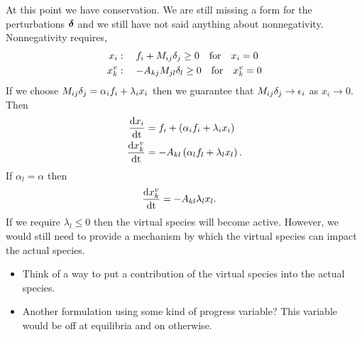 At this point we have conservation.  We are still missing a form 
for the perturbations $\boldsymbol{\delta}$ and we still have not said anything 
about nonnegativity.  Nonnegativity requires,
\begin{align}
  x_{i}    &: \quad f_{i} + M_{ij}\delta_{j} \geq 0 
       \quad \textrm{for} \quad x_{i} = 0 \\
  x_{k}^{v}&: \quad -A_{kj}M_{jl}\delta_{l} \geq 0 
       \quad \textrm{for} \quad x_{k}^{v} = 0
\end{align}
If we choose $M_{ij}\delta_{j} = \alpha_{i}f_{i} + \lambda_{i}x_{i}$ 
then we guarantee that $M_{ij}\delta_{j} \to \epsilon_{i}$ as 
$x_{i} \to 0$.  Then 
\begin{align}
  \frac{\mathrm{d} x_{i}}{\mathrm{d} \mathrm{t}} &= f_{i} + \left(\alpha_{i}f_{i} + \lambda_{i}x_{i}\right) \\
  \frac{\mathrm{d} x_{k}^{v}}{\mathrm{d} \mathrm{t}} &= -A_{kl}\left(\alpha_{l}f_{l} + \lambda_{l}x_{l}\right).
\end{align}
If $\alpha_{l} = \alpha$ then 
\begin{align}
  \frac{\mathrm{d} x_{k}^{v}}{\mathrm{d} \mathrm{t}} &= -A_{kl}\lambda_{l}x_{l}.
\end{align}
If we require $\lambda_{l} \leq 0$ then the virtual species 
will become active.  However, we would still need to provide 
a mechanism by which the virtual species can impact the 
actual species.

\begin{tcolorbox}[arc is angular, title=Some thoughts...]
  \begin{itemize}
    \item Think of a way to put a contribution of the 
          virtual species into the actual species.
    \item Another formulation using some kind of progress 
          variable?  This variable would be off at 
          equilibria and on otherwise.
  \end{itemize}
\end{tcolorbox}
